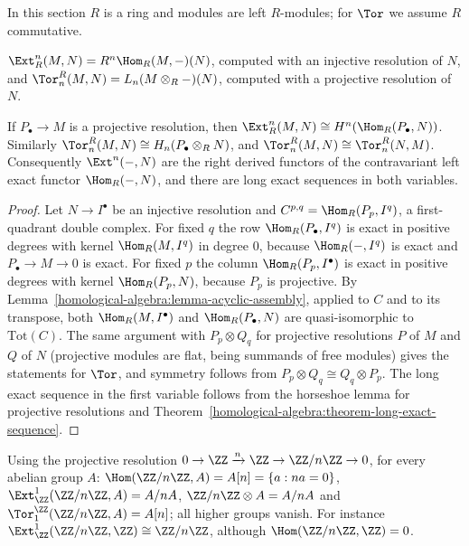 In this section $R$ is a ring and modules are left $R$-modules; for $\Tor$ we assume $R$ commutative.

\begin{definition}\label{homological-algebra:definition-ext-tor}
$\Ext^n_R(M, N) = R^n\Hom_R(M, -)(N)$, computed with an injective resolution of $N$, and
$\Tor_n^R(M, N) = L_n(M \otimes_R -)(N)$, computed with a projective resolution of $N$.
\end{definition}

\begin{theorem}[Balance]\label{homological-algebra:theorem-balance}
If $P_\bullet \to M$ is a projective resolution, then $\Ext^n_R(M, N) \cong H^n(\Hom_R(P_\bullet, N))$. Similarly
$\Tor_n^R(M, N) \cong H_n(P_\bullet \otimes_R N)$, and $\Tor_n^R(M, N) \cong \Tor_n^R(N, M)$. Consequently $\Ext^n(-, N)$ are the right
derived functors of the contravariant left exact functor $\Hom_R(-, N)$, and there are long exact sequences in both
variables.
\end{theorem}

\begin{proof}
Let $N \to I^\bullet$ be an injective resolution and $C^{p,q} = \Hom_R(P_p, I^q)$, a first-quadrant double complex. For fixed $q$ the
row $\Hom_R(P_\bullet, I^q)$ is exact in positive degrees with kernel $\Hom_R(M, I^q)$ in degree $0$, because $\Hom_R(-, I^q)$ is
exact and $P_\bullet \to M \to 0$ is exact. For fixed $p$ the column $\Hom_R(P_p, I^\bullet)$ is exact in positive degrees with kernel
$\Hom_R(P_p, N)$, because $P_p$ is projective. By Lemma~\ref{homological-algebra:lemma-acyclic-assembly}, applied to $C$ and to its
transpose, both $\Hom_R(M, I^\bullet)$ and $\Hom_R(P_\bullet, N)$ are quasi-isomorphic to $\mathrm{Tot}(C)$. The same argument with
$P_p \otimes Q_q$ for projective resolutions $P$ of $M$ and $Q$ of $N$ (projective modules are flat, being summands of free
modules) gives the statements for $\Tor$, and symmetry follows from $P_p \otimes Q_q \cong Q_q \otimes P_p$. The long exact sequence
in the first variable follows from the horseshoe lemma for projective resolutions and
Theorem~\ref{homological-algebra:theorem-long-exact-sequence}.
\end{proof}

\begin{example}\label{homological-algebra:example-ext-tor-cyclic}
Using the projective resolution $0 \to \ZZ \xrightarrow{n} \ZZ \to \ZZ/n\ZZ \to 0$, for every abelian group $A$:
$\Hom(\ZZ/n\ZZ, A) = A[n] = \{a : na = 0\}$, $\Ext^1_\ZZ(\ZZ/n\ZZ, A) = A/nA$, $\ZZ/n\ZZ \otimes A = A/nA$ and
$\Tor_1^\ZZ(\ZZ/n\ZZ, A) = A[n]$; all higher groups vanish. For instance $\Ext^1_\ZZ(\ZZ/n\ZZ, \ZZ) \cong \ZZ/n\ZZ$, although
$\Hom(\ZZ/n\ZZ, \ZZ) = 0$.
\end{example}

